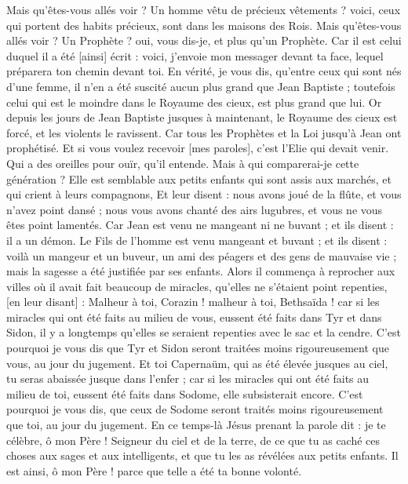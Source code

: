 \begin{multicols}{2}
Mais qu'êtes-vous allés voir ? Un homme vêtu de précieux vêtements ? voici, ceux qui portent des habits précieux, sont dans les maisons des Rois.
Mais qu'êtes-vous allés voir ? Un Prophète ? oui, vous dis-je, et plus qu'un Prophète.
Car il est celui duquel il a été [ainsi] écrit : voici, j'envoie mon messager devant ta face, lequel préparera ton chemin devant toi.
En vérité, je vous dis, qu'entre ceux qui sont nés d'une femme, il n'en a été suscité aucun plus grand que Jean Baptiste ; toutefois celui qui est le moindre dans le Royaume des cieux, est plus grand que lui.
Or depuis les jours de Jean Baptiste jusques à maintenant, le Royaume des cieux est forcé, et les violents le ravissent.
Car tous les Prophètes et la Loi jusqu'à Jean ont prophétisé.
Et si vous voulez recevoir [mes paroles], c'est l'Elie qui devait venir.
Qui a des oreilles pour ouïr, qu'il entende.
Mais à qui comparerai-je cette génération ? Elle est semblable aux petits enfants qui sont assis aux marchés, et qui crient à leurs compagnons,
Et leur disent : nous avons joué de la flûte, et vous n'avez point dansé ; nous vous avons chanté des airs lugubres, et vous ne vous êtes point lamentés.
Car Jean est venu ne mangeant ni ne buvant ; et ils disent : il a un démon.
Le Fils de l'homme est venu mangeant et buvant ; et ils disent : voilà un mangeur et un buveur, un ami des péagers et des gens de mauvaise vie ; mais la sagesse a été justifiée par ses enfants.
Alors il commença à reprocher aux villes où il avait fait beaucoup de miracles, qu'elles ne s'étaient point repenties, [en leur disant] :
Malheur à toi, Corazin ! malheur à toi, Bethsaïda ! car si les miracles qui ont été faits au milieu de vous, eussent été faits dans Tyr et dans Sidon, il y a longtemps qu'elles se seraient repenties avec le sac et la cendre.
C'est pourquoi je vous dis que Tyr et Sidon seront traitées moins rigoureusement que vous, au jour du jugement.
Et toi Capernaüm, qui as été élevée jusques au ciel, tu seras abaissée jusque dans l'enfer ; car si les miracles qui ont été faits au milieu de toi, eussent été faits dans Sodome, elle subsisterait encore.
C'est pourquoi je vous dis, que ceux de Sodome seront traités moins rigoureusement que toi, au jour du jugement.
En ce temps-là Jésus prenant la parole dit : je te célèbre, ô mon Père ! Seigneur du ciel et de la terre, de ce que tu as caché ces choses aux sages et aux intelligents, et que tu les as révélées aux petits enfants.
Il est ainsi, ô mon Père ! parce que telle a été ta bonne volonté.

\end{multicols}
